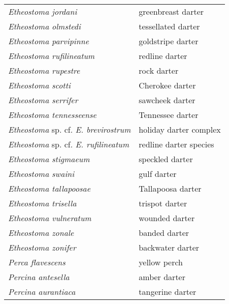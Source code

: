 \documentclass[11pt]{article}
\begin{document}
\vspace{\baselineskip}

%
\textbf{\Student}

\begin{tabular}{@{}L{3in}L{3in}@{}}
\textit{Etheostoma jordani} &   greenbreast darter\tabularnewline
\textit{Etheostoma olmstedi} &   tessellated darter\tabularnewline
\textit{Etheostoma parvipinne} &   goldstripe darter\tabularnewline
\textit{Etheostoma rufilineatum} &   redline darter\tabularnewline
\textit{Etheostoma rupestre} &   rock darter\tabularnewline
\textit{Etheostoma scotti} &   Cherokee darter\tabularnewline
\textit{Etheostoma serrifer} &   sawcheek darter\tabularnewline
\textit{Etheostoma tennesseense} &   Tennessee darter\tabularnewline
\textit{Etheostoma} sp. cf. \textit{E. brevirostrum} &   holiday darter complex\tabularnewline
\textit{Etheostoma} sp. cf. \textit{E. rufilineatum} &   redline darter species\tabularnewline
\textit{Etheostoma stigmaeum} &   speckled darter\tabularnewline
\textit{Etheostoma swaini} &   gulf darter\tabularnewline
\textit{Etheostoma tallapoosae} &   Tallapoosa darter\tabularnewline
\textit{Etheostoma trisella} &   trispot darter\tabularnewline
\textit{Etheostoma vulneratum} &   wounded darter\tabularnewline
\textit{Etheostoma zonale} &   banded darter\tabularnewline
\textit{Etheostoma zonifer} &   backwater darter\tabularnewline
\textit{Perca flavescens} &   yellow perch\tabularnewline
\textit{Percina antesella} &   amber darter\tabularnewline
\textit{Percina aurantiaca} &   tangerine darter\tabularnewline
\end{tabular}

\newpage

\vspace{\baselineskip}

%
\textbf{\Student}
\end{document}
